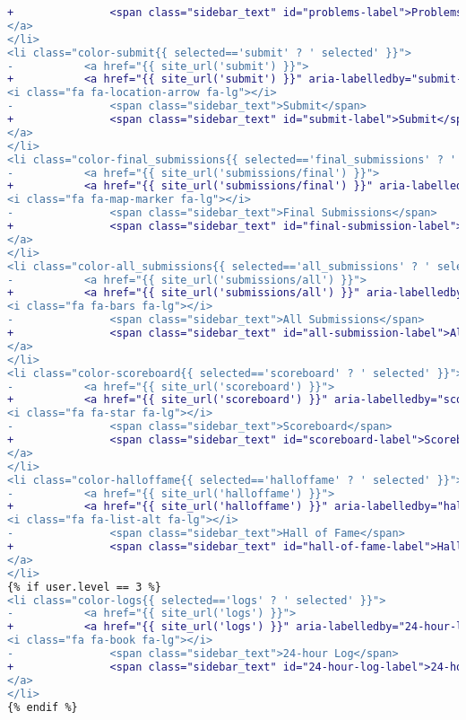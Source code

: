 \begin{itemize}
\begin{lstlisting}[language=diff, caption=Perubahan untuk mematuhi kriteria 2.4.4, label=lst_2.4.4, basicstyle=\ttfamily, frame=single,
columns=fullflexible, keepspaces=true, breaklines=true]
+ 				<span class="sidebar_text" id="problems-label">Problems</span>
</a>
</li>
<li class="color-submit{{ selected=='submit' ? ' selected' }}">
- 			<a href="{{ site_url('submit') }}">
+ 			<a href="{{ site_url('submit') }}" aria-labelledby="submit-label">
<i class="fa fa-location-arrow fa-lg"></i>
- 				<span class="sidebar_text">Submit</span>
+ 				<span class="sidebar_text" id="submit-label">Submit</span>
</a>
</li>
<li class="color-final_submissions{{ selected=='final_submissions' ? ' selected' }}">
- 			<a href="{{ site_url('submissions/final') }}">
+ 			<a href="{{ site_url('submissions/final') }}" aria-labelledby="final-submission-label">
<i class="fa fa-map-marker fa-lg"></i>
- 				<span class="sidebar_text">Final Submissions</span>
+ 				<span class="sidebar_text" id="final-submission-label">Final Submissions</span>
</a>
</li>
<li class="color-all_submissions{{ selected=='all_submissions' ? ' selected' }}">
- 			<a href="{{ site_url('submissions/all') }}">
+ 			<a href="{{ site_url('submissions/all') }}" aria-labelledby="all-submission-label">
<i class="fa fa-bars fa-lg"></i>
- 				<span class="sidebar_text">All Submissions</span>
+ 				<span class="sidebar_text" id="all-submission-label">All Submissions</span>
</a>
</li>
<li class="color-scoreboard{{ selected=='scoreboard' ? ' selected' }}">
- 			<a href="{{ site_url('scoreboard') }}">
+ 			<a href="{{ site_url('scoreboard') }}" aria-labelledby="scoreboard-label">
<i class="fa fa-star fa-lg"></i>
- 				<span class="sidebar_text">Scoreboard</span>
+ 				<span class="sidebar_text" id="scoreboard-label">Scoreboard</span>
</a>
</li>
<li class="color-halloffame{{ selected=='halloffame' ? ' selected' }}">
- 			<a href="{{ site_url('halloffame') }}">
+ 			<a href="{{ site_url('halloffame') }}" aria-labelledby="hall-of-fame-label">
<i class="fa fa-list-alt fa-lg"></i>
- 				<span class="sidebar_text">Hall of Fame</span>
+ 				<span class="sidebar_text" id="hall-of-fame-label">Hall of Fame</span>
</a>
</li>
{% if user.level == 3 %}
<li class="color-logs{{ selected=='logs' ? ' selected' }}">
- 			<a href="{{ site_url('logs') }}">
+ 			<a href="{{ site_url('logs') }}" aria-labelledby="24-hour-log-label">
<i class="fa fa-book fa-lg"></i>
- 				<span class="sidebar_text">24-hour Log</span>
+ 				<span class="sidebar_text" id="24-hour-log-label">24-hour Log</span>
</a>
</li>
{% endif %}


\end{lstlisting}
\end{itemize}
